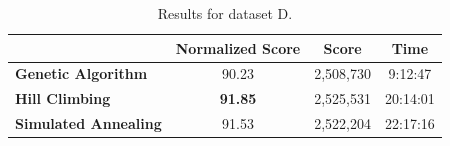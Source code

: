 \begin{table}[h]
\centering\footnotesize\sf
\begin{tabular}{lccc}
\toprule
& Normalized Score & Score & Time \\
\midrule
\textcolor{myblue}{\textbf{Genetic Algorithm}} & 90.23 & 2,508,730 & 9:12:47 \\
\textcolor{myorange}{\textbf{Hill Climbing}} & \textbf{91.85} & 2,525,531 & 20:14:01 \\
\textcolor{mygreen}{\textbf{Simulated Annealing}} & 91.53 & 2,522,204 & 22:17:16 \\
\bottomrule
\end{tabular}
\caption[Results for dataset D]{Results for dataset D.}
\label{tab:dataset_d_results}
\end{table}






